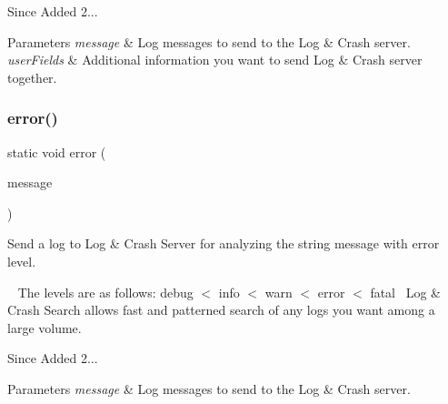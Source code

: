\begin{DoxySince}{Since}
Added 2... 
\end{DoxySince}

\begin{DoxyParams}{Parameters}
{\em message} & Log messages to send to the Log \& Crash server. \\
\hline
{\em user\+Fields} & Additional information you want to send Log \& Crash server together. \\
\hline
\end{DoxyParams}
\mbox{\label{classcom_1_1toast_1_1android_1_1gamebase_1_1_gamebase_1_1_logger_a9d9271894eacdf4fe29901d4f0bf2254}} 
\subsubsection{\texorpdfstring{error()}{error()}\hspace{0.1cm}{\footnotesize\ttfamily [1/3]}}
{\footnotesize\ttfamily static void error (\begin{DoxyParamCaption}\item[{@Non\+Null final String}]{message }\end{DoxyParamCaption})\hspace{0.3cm}{\ttfamily [static]}}



Send a log to Log \& Crash Server for analyzing the string message with error level. 

~\newline
 The levels are as follows\+: debug $<$ info $<$ warn $<$ error $<$ fatal~\newline
 Log \& Crash Search allows fast and patterned search of any logs you want among a large volume.

\begin{DoxySince}{Since}
Added 2... 
\end{DoxySince}

\begin{DoxyParams}{Parameters}
{\em message} & Log messages to send to the Log \& Crash server. \\
\hline
\end{DoxyParams}
\mbox{\label{classcom_1_1toast_1_1android_1_1gamebase_1_1_gamebase_1_1_logger_a1215d6d113ed5727c1a8c4499df8f319}} 
